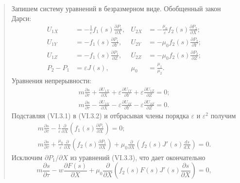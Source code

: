 \documentclass[12pt,a4paper]{article}
\begin{document}
\begin{quote}
Запишем систему уравнений в безразмерном виде. Обобщенный закон Дарси:
\begin{equation}\begin{aligned}
U_{1X}&=-\frac1\varepsilon f_1(s)\frac{\partial P_1}{\partial X},&U_{2X}&=-\frac{\mu_0}{\varepsilon}f_2(s)\frac{\partial P_2}{\partial X};\\
U_{1Y}&=-f_1(s)\frac{\partial P_1}{\partial Y},&U_{2Y}&=-\mu_0f_2(s)\frac{\partial P_2}{\partial Y};\\
U_{1Z}&=-f_1(s)\frac{\partial P_1}{\partial Z},&U_{2Z}&=-\mu_0f_2(s)\frac{\partial P_2}{\partial Z};\\
P_2-P_1&=\varepsilon J(s),&\mu_0&=\frac{\mu_1}{\mu_2}.
\end{aligned}\tag{VI.3.1}\label{q12:eq-VI-3-1}\end{equation}
Уравнения непрерывности:
\begin{equation}\begin{gathered}
m\frac{\partial s}{\partial\tau}+\frac{\partial U_{1X}}{\partial X}+\varepsilon\frac{\partial U_{1Y}}{\partial Y}+\varepsilon\frac{\partial U_{1Z}}{\partial Z}=0;\\
m\frac{\partial s}{\partial\tau}-\frac{\partial U_{2X}}{\partial X}-\varepsilon\frac{\partial U_{2Y}}{\partial Y}-\varepsilon\frac{\partial U_{2Z}}{\partial Z}=0.
\end{gathered}\tag{VI.3.2}\label{q12:eq-VI-3-2}\end{equation}
Подставляя (VI.3.1) в (VI.3.2) и отбрасывая члены порядка $\varepsilon$ и $\varepsilon^2$ получим
\begin{equation}\begin{gathered}
m\frac{\partial s}{\partial\tau}-\frac1\varepsilon\frac{\partial}{\partial X}\left(f_1(s)\frac{\partial P_1}{\partial X}\right)=0;\\
m\frac{\partial s}{\partial\tau}+\frac{\mu_0}{\varepsilon}\frac{\partial}{\partial X}\left(f_2(s)\frac{\partial P_1}{\partial X}\right)+\mu_0\frac{\partial}{\partial X}\left(f_2(s)J'(s)\frac{ds}{dX}\right)=0.
\end{gathered}\tag{VI.3.3}\label{q12:eq-VI-3-3}\end{equation}
Исключим $\partial P_1/\partial X$ из уравнений (VI.3.3), что дает окончательно
\begin{equation}m\frac{\partial s}{\partial\tau}-w\frac{\partial F(s)}{\partial X}+\mu_0\frac{\partial}{\partial X}\left(f_2(s)F(s)J'(s)\frac{\partial s}{\partial X}\right)=0,\tag{VI.3.4}\label{q12:eq-VI-3-4}\end{equation}

\end{quote}
\end{document}
